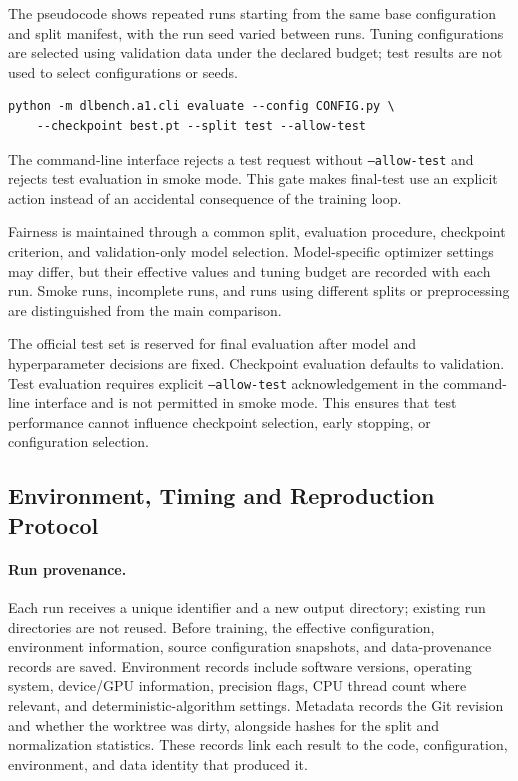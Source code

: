 \documentclass[11pt,a4paper]{article}
\begin{document}
The pseudocode shows repeated runs starting from the same base configuration and split manifest, with the run seed varied between runs. Tuning configurations are selected using validation data under the declared budget; test results are not used to select configurations or seeds.

\begin{lstlisting}[language={},caption={Explicit final-test evaluation after model selection is frozen.},label={lst:test-command}]
python -m dlbench.a1.cli evaluate --config CONFIG.py \
    --checkpoint best.pt --split test --allow-test
\end{lstlisting}

The command-line interface rejects a test request without \texttt{--allow-test} and rejects test evaluation in smoke mode. This gate makes final-test use an explicit action instead of an accidental consequence of the training loop.

Fairness is maintained through a common split, evaluation procedure, checkpoint criterion, and validation-only model selection. Model-specific optimizer settings may differ, but their effective values and tuning budget are recorded with each run. Smoke runs, incomplete runs, and runs using different splits or preprocessing are distinguished from the main comparison.

The official test set is reserved for final evaluation after model and hyperparameter decisions are fixed. Checkpoint evaluation defaults to validation. Test evaluation requires explicit \texttt{--allow-test} acknowledgement in the command-line interface and is not permitted in smoke mode. This ensures that test performance cannot influence checkpoint selection, early stopping, or configuration selection.

\subsection{Environment, Timing and Reproduction Protocol}

\paragraph{Run provenance.} Each run receives a unique identifier and a new output directory; existing run directories are not reused. Before training, the effective configuration, environment information, source configuration snapshots, and data-provenance records are saved. Environment records include software versions, operating system, device/GPU information, precision flags, CPU thread count where relevant, and deterministic-algorithm settings. Metadata records the Git revision and whether the worktree was dirty, alongside hashes for the split and normalization statistics. These records link each result to the code, configuration, environment, and data identity that produced it.
\end{document}
